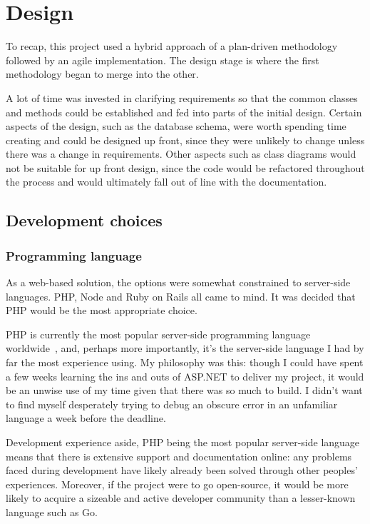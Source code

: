 \chapter{Design}

To recap, this project used a hybrid approach of a plan-driven methodology followed by an agile implementation. The design stage is where the first methodology began to merge into the other.

A lot of time was invested in clarifying requirements so that the common classes and methods could be established and fed into parts of the initial design. Certain aspects of the design, such as the database schema, were worth spending time creating and could be designed up front, since they were unlikely to change unless there was a change in requirements. Other aspects such as class diagrams would not be suitable for up front design, since the code would be refactored throughout the process and would ultimately fall out of line with the documentation.

\section{Development choices}

\subsection{Programming language}

As a web-based solution, the options were somewhat constrained to server-side languages. PHP, Node and Ruby on Rails all came to mind. It was decided that PHP would be the most appropriate choice.

PHP is currently the most popular server-side programming language worldwide~\cite{phpPopular}, and, perhaps more importantly, it's the server-side language I had by far the most experience using. My philosophy was this: though I could have spent a few weeks learning the ins and outs of ASP.NET to deliver my project, it would be an unwise use of my time given that there was so much to build. I didn't want to find myself desperately trying to debug an obscure error in an unfamiliar language a week before the deadline.

Development experience aside, PHP being the most popular server-side language means that there is extensive support and documentation online: any problems faced during development have likely already been solved through other peoples' experiences. Moreover, if the project were to go open-source, it would be more likely to acquire a sizeable and active developer community than a lesser-known language such as Go.

